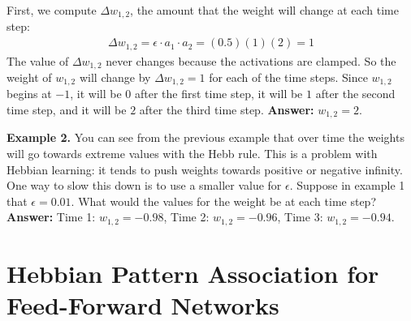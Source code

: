 First, we compute $\Delta w_{1,2}$, the  amount that the weight will change at each time step:
\begin{eqnarray*}
\Delta w_{1,2} = \epsilon \cdot a_1 \cdot a_2 = (0.5)(1)(2) = 1
\end{eqnarray*}
The value of $\Delta w_{1,2}$ never changes because the activations are 
clamped. So the weight of $w_{1,2}$ will change by $\Delta w_{1,2} = 1$ for
each of the time steps. Since $w_{1,2}$ begins at $-1$, it will be $0$ after 
the first time step, it will be $1$ after the second time step, and it will be 
$2$ after the third time step. {\bf Answer:} $w_{1,2} = 2$.

\bigskip

\noindent
{\bf Example 2.} You can see from the previous example that over time the weights will 
go towards extreme values with the Hebb rule. This is a problem with Hebbian 
learning: it tends to push weights towards positive or negative infinity. One way to slow 
this down is to use a smaller value for $\epsilon$. Suppose in example 1 that
$\epsilon =  0.01$. What would the values for the weight be at each time step?
{\bf Answer:} Time 1: $w_{1,2} = -0.98$, Time 2: $w_{1,2} = -0.96$, Time 3: $w_{1,2} = -0.94$.

\section{Hebbian Pattern Association for Feed-Forward Networks}\label{ff_associator}

